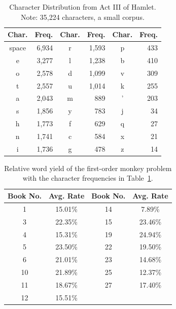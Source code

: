\documentclass[conference]{IEEEtran}
\newcommand{\codefile}[1]{
  \begin{framed}
  \fontsize{5.65}{6.78}\selectfont
  
  \end{framed}
}
\begin{document}
\begin{table}
\caption{\hspace{2em}Character Distribution from Act III of Hamlet. \newline
Note: 35,224 characters, a small corpus.\label{tab:hamlet}}
\vspace{-10pt}
\begin{center}
\begin{tabular}{crcrcr}
\hline
Char. & Freq. & Char. & Freq. & Char. & Freq. \\
\hline
space & 6,934  & r     & 1,593  & p     & 433   \\
e     & 3,277  & l     & 1,238  & b     & 410   \\
o     & 2,578  & d     & 1,099  & v     & 309   \\
t     & 2,557  & u     & 1,014  & k     & 255   \\
a     & 2,043  & m     & 889   & '     & 203   \\
s     & 1,856  & y     & 783   & j     & 34    \\
h     & 1,773  & f     & 629   & q     & 27    \\
n     & 1,741  & c     & 584   & x     & 21    \\
i     & 1,736  & g     & 478   & z     & 14    \\
\hline
\end{tabular}
\end{center}
\end{table}

\codefile{problem1b.py}

\begin{table}
\caption{Relative word yield of the first-order monkey problem \newline
with the character frequencies in Table~\ref{tab:hamlet}.\label{tab:problem1b}}
\vspace{-10pt}
\begin{center}
\begin{tabular}{cccc}
\hline
Book No. & Avg. Rate & Book No. & Avg. Rate \\
\hline
1  & 15.01\% & 14 & 7.89\% \\
3  & 22.35\% & 15 & 23.46\% \\
4  & 15.31\% & 19 & 24.94\% \\
5  & 23.50\% & 22 & 19.50\% \\
6  & 21.01\% & 23 & 14.68\% \\
10 & 21.89\% & 25 & 12.37\% \\
11 & 18.67\% & 27 & 17.40\% \\
12 & 15.51\% & & \\
\hline
\end{tabular}
\end{center}
\end{table}
\end{document}

